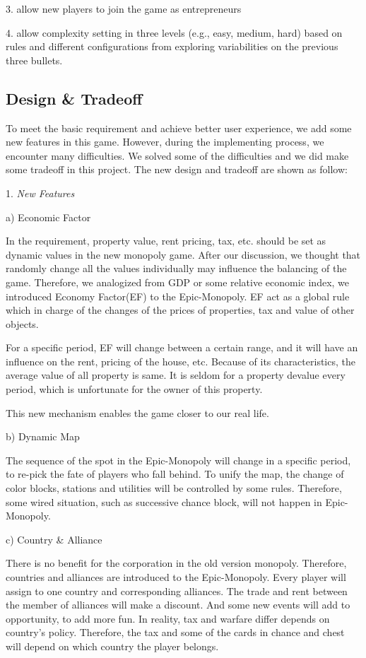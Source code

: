 \documentclass[a4paper,11pt]{article}
\begin{document}
3.	allow new players to join the game as entrepreneurs

4.	allow complexity setting in three levels (e.g., easy, medium, hard) based on rules and different configurations from exploring variabilities on the previous three bullets.

\subsection{Design \& Tradeoff}
To meet the basic requirement and achieve better user experience, we add some new features in this game. However, during the implementing process, we encounter many difficulties. We solved some of the difficulties and we did make some tradeoff in this project. The new design and tradeoff are shown as follow:

1.	\emph{New Features}

a)	Economic Factor

In the requirement, property value, rent pricing, tax, etc. should be set as dynamic values in the new monopoly game. After our discussion, we thought that randomly change all the values individually may influence the balancing of the game. Therefore, we analogized from GDP or some relative economic index, we introduced Economy Factor(EF) to the Epic-Monopoly. EF act as a global rule which in charge of the changes of the prices of properties, tax and value of other objects. 

For a specific period, EF will change between a certain range, and it will have an influence on the rent, pricing of the house, etc. Because of its characteristics, the average value of all property is same. It is seldom for a property devalue every period, which is unfortunate for the owner of this property.

This new mechanism enables the game closer to our real life.

b)	Dynamic Map

The sequence of the spot in the Epic-Monopoly will change in a specific period, to re-pick the fate of players who fall behind. To unify the map, the change of color blocks, stations and utilities will be controlled by some rules. Therefore, some wired situation, such as successive chance block, will not happen in Epic-Monopoly.

c)	Country \& Alliance

There is no benefit for the corporation in the old version monopoly. Therefore, countries and alliances are introduced to the Epic-Monopoly. Every player will assign to one country and corresponding alliances. The trade and rent between the member of alliances will make a discount. And some new events will add to opportunity, to add more fun. In reality, tax and warfare differ depends on country's policy. Therefore, the tax and some of the cards in chance and chest will depend on which country the player belongs.
\end{document}
